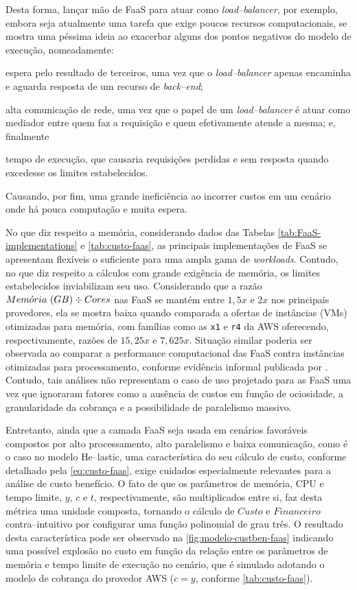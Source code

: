 \documentclass[english,brazilian]{UNISINOSmonografia} %
\begin{document}
Desta forma, lançar mão de FaaS para atuar como \textit{load--balancer}, por exemplo, embora seja atualmente uma tarefa que exige poucos recursos computacionais, se mostra uma péssima ideia ao exacerbar alguns dos pontos negativos do modelo de execução, nomeadamente:
\begin{inparaenum}
	\item espera pelo resultado de terceiros, uma vez que o \textit{load--balancer} apenas encaminha e aguarda resposta de um recurso de \textit{back--end};
	~
	\item alta comunicação de rede, uma vez que o papel de um \textit{load--balancer} é atuar como mediador entre quem faz a requisição e quem efetivamente atende a mesma; e, finalmente
	~
	\item tempo de execução, que causaria requisições perdidas e sem resposta quando excedesse os limites estabelecidos.
\end{inparaenum}
Causando, por fim, uma grande ineficiência ao incorrer custos em um cenário onde há pouca computação e muita espera.


No que diz respeito a memória, considerando dados das Tabelas \ref{tab:FaaS-implementations} e \ref{tab:custo-faas}, as principais implementações de FaaS se apresentam flexíveis o suficiente para uma ampla gama de \textit{workloads}.
Contudo, no que diz respeito a cálculos com grande exigência de memória, os limites estabelecidos inviabilizam seu uso.
Considerando que a razão $ Mem\acute{o}ria~{\small (GB)} \div Cores $ nas FaaS se mantém entre $ 1,5x $ e $ 2x $ nos principais provedores, ela se mostra baixa quando comparada a ofertas de instâncias (VMs) otimizadas para memória, com famílias como as \texttt{x1} e \texttt{r4} da AWS oferecendo, respectivamente, razões de $15,25x$ e $7,625x$.
Situação similar poderia ser observada ao comparar a performance computacional das FaaS contra instâncias otimizadas para processamento, conforme evidência informal publicada por \cite{CloudABC}.
Contudo, tais análises não representam o caso de uso projetado para as FaaS uma vez que ignoraram fatores como a ausência de custos em função de ociosidade, a granularidade da cobrança e a possibilidade de paralelismo massivo.


Entretanto, ainda que a camada FaaS seja usada em cenários favoráveis compostos por alto processamento, alto paralelismo e baixa comunicação, como é o caso no modelo \textsf{He}--lastic, uma característica do seu cálculo de custo, conforme detalhado pela \autoref{eq:custo-faas}, exige cuidados especialmente relevantes para a análise de custo benefício.
O fato de que os parâmetros de memória, CPU e tempo limite, $y$, $c$ e $t$, respectivamente, são multiplicados entre si, faz desta métrica uma unidade composta, tornando o cálculo de $ Custo $ e $ Financeiro $ contra--intuitivo por configurar uma função polinomial de grau três.
O resultado desta característica pode ser observado na \autoref{fig:modelo-custben-faas} indicando uma possível explosão no custo em função da relação entre os parâmetros de memória e tempo limite de execução no cenário, que é simulado adotando o modelo de cobrança do provedor AWS ($ c = y $, conforme \autoref{tab:custo-faas}).
\end{document}
